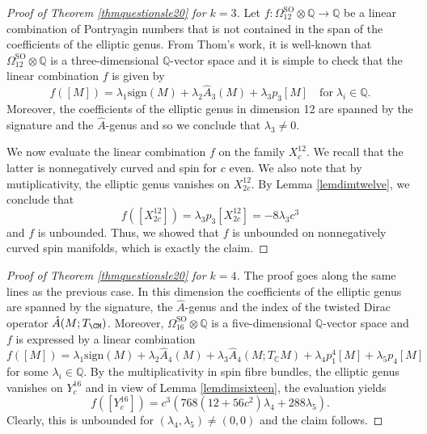 \documentclass[10pt,a4paper]{amsart}
\theoremstyle{thm}
\theoremstyle{text}
\begin{document}
\begin{proof}[Proof of Theorem \ref{thmquestionsle20} for $k=3$]
Let $f: \Omega_{12}^{\textrm{SO}} \otimes {\mathbb{Q}} \rightarrow {\mathbb{Q}}$ be a linear combination of Pontryagin numbers that is not contained in the span of the coefficients of the elliptic genus. From Thom's work, it is well-known that $\Omega_{12}^{\textrm{SO}} \otimes {\mathbb{Q}}$ is a three-dimensional ${\mathbb{Q}}$-vector space and it is simple to check that the linear combination $f$ is given by
\[ f([M]) = \lambda_1 \textrm{sign}(M) + \lambda_2 \hat{A}_3(M) + \lambda_3 p_3[M] \quad \textrm{for} \; \lambda_i \in {\mathbb{Q}}.\]
Moreover, the coefficients of the elliptic genus in dimension 12 are spanned by the signature and the $\hat{A}$-genus and so we conclude that $\lambda_3 \neq 0$.

We now evaluate the linear combination $f$ on the family $X^{12}_{c}$. We recall that the latter is nonnegatively curved and spin for $c$ even.  We also note that by mutiplicativity, the elliptic genus vanishes on $X^{12}_{2c}$. By Lemma \ref{lemdimtwelve}, we conclude that
\[ f([X^{12}_{2c}]) = \lambda_3 p_3[X^{12}_{2c}] = - 8 \lambda_3 c^3\]
and $f$ is unbounded. Thus, we showed that $f$ is unbounded on nonnegatively curved spin manifolds, which is exactly the claim.
\end{proof}

\begin{proof}[Proof of Theorem \ref{thmquestionsle20} for $k=4$]
The proof goes along the same lines as the previous case. In this dimension the coefficients of the elliptic genus are spanned by the signature, the $\hat{A}$-genus and the index of the twisted Dirac operator $\hat{A}(M; T_\CM)$. Moreover, $\Omega_{16}^{\textrm{SO}} \otimes {\mathbb{Q}}$ is a five-dimensional ${\mathbb{Q}}$-vector space and $f$ is expressed by a linear combination
\[ f([M])= \lambda_1 \textrm{sign}(M) + \lambda_2 \hat{A}_4(M) + \lambda_3 \hat{A}_4 (M; T_{\mathbb{C}} M) + \lambda_4 p_1^4[M]+ \lambda_5 p_4[M]\]
for some $\lambda_i \in {\mathbb{Q}}$. By the multiplicativity in spin fibre bundles, the elliptic genus vanishes on $Y^{16}_c$ and in view of Lemma \ref{lemdimsixteen}, the evaluation yields
\[ f([Y^{16}_c]) = c^3 (768(12+56c^2)\lambda_4  + 288 \lambda_5).\]
Clearly, this is unbounded for $(\lambda_4, \lambda_5) \neq (0,0)$ and the claim follows.
\end{proof}
\end{document}
